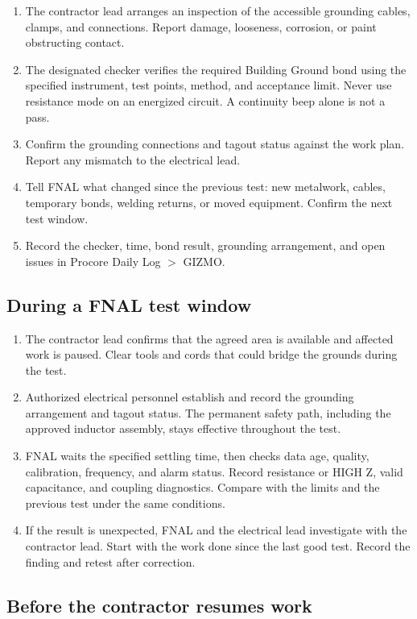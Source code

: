 \documentclass[11pt]{article}
\begin{document}
\begin{enumerate}
  \item The contractor lead arranges an inspection of the accessible grounding cables, clamps, and connections. Report damage, looseness, corrosion, or paint obstructing contact.
  \item The designated checker verifies the required Building Ground bond using the specified instrument, test points, method, and acceptance limit. Never use resistance mode on an energized circuit. A continuity beep alone is not a pass.
  \item Confirm the grounding connections and tagout status against the work plan. Report any mismatch to the electrical lead.
  \item Tell FNAL what changed since the previous test: new metalwork, cables, temporary bonds, welding returns, or moved equipment. Confirm the next test window.
  \item Record the checker, time, bond result, grounding arrangement, and open issues in Procore Daily Log $>$ GIZMO.
\end{enumerate}

\subsection{During a FNAL test window}

\begin{enumerate}
  \item The contractor lead confirms that the agreed area is available and affected work is paused. Clear tools and cords that could bridge the grounds during the test.
  \item Authorized electrical personnel establish and record the grounding arrangement and tagout status. The permanent safety path, including the approved inductor assembly, stays effective throughout the test.
  \item FNAL waits the specified settling time, then checks data age, quality, calibration, frequency, and alarm status. Record resistance or HIGH Z, valid capacitance, and coupling diagnostics. Compare with the limits and the previous test under the same conditions.
  \item If the result is unexpected, FNAL and the electrical lead investigate with the contractor lead. Start with the work done since the last good test. Record the finding and retest after correction.
\end{enumerate}

\subsection{Before the contractor resumes work}
\end{document}
